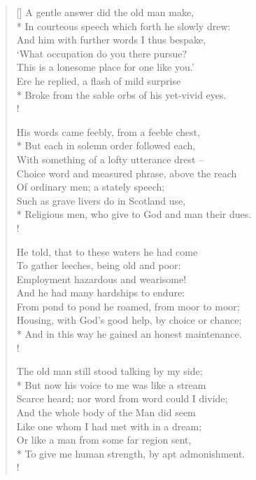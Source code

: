 \documentclass[MAIN]{subfiles}
\begin{document}
\begin{verse}[\versewidth]
A gentle answer did the old man make,\\*
\vin In courteous speech which forth he slowly drew:\\ 
And him with further words I thus bespake,\\
\vin `What occupation do you there pursue?\\ 
\vin This is a lonesome place for one like you.'\\
Ere he replied, a flash of mild surprise\\*
Broke from the sable orbs of his yet-vivid eyes.\\!

His words came feebly, from a feeble chest,\\*
\vin But each in solemn order followed each,\\
With something of a lofty utterance drest --\\
\vin Choice word and measured phrase, above the reach\\
\vin Of ordinary men; a stately speech;\\
Such as grave livers do in Scotland use,\\*
Religious men, who give to God and man their dues.\\!

He told, that to these waters he had come\\
\vin To gather leeches, being old and poor:\\
Employment hazardous and wearisome!\\
\vin And he had many hardships to endure:\\
\vin From pond to pond he roamed, from moor to moor;\\
Housing, with God's good help, by choice or chance;\\*
And in this way he gained an honest maintenance.\\!

The old man still stood talking by my side;\\*
\vin But now his voice to me was like a stream\\
Scarce heard; nor word from word could I divide;\\
\vin And the whole body of the Man did seem\\
\vin Like one whom I had met with in a dream;\\
Or like a man from some far region sent,\\*
To give me human strength, by apt admonishment.\\!


\end{verse}
\end{document}

